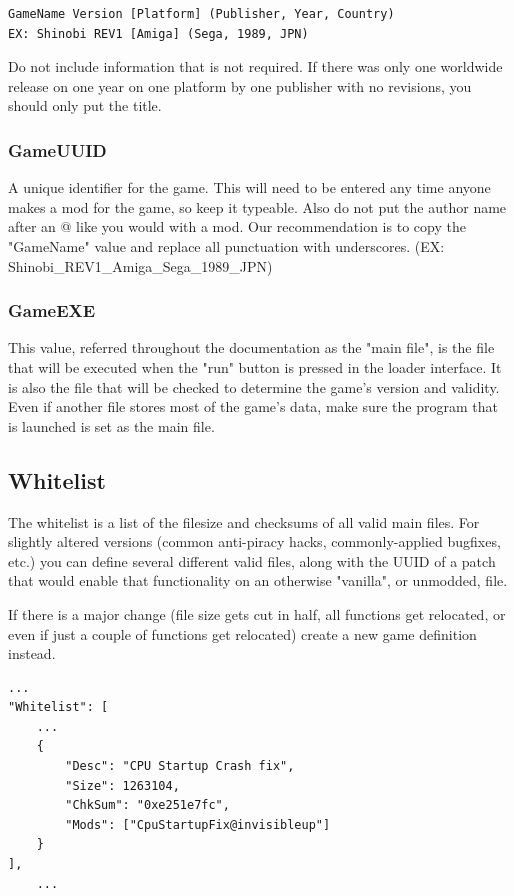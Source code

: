 \documentclass[12pt,a4paper,notitlepage]{article}
\begin{document}
\begin{lstlisting}[breaklines=true]
GameName Version [Platform] (Publisher, Year, Country)
EX: Shinobi REV1 [Amiga] (Sega, 1989, JPN)
\end{lstlisting}

Do not include information that is not required. If there was only one worldwide release on one year on one platform by one publisher with no revisions, you should only put the title.

\subsubsection{GameUUID}
A unique identifier for the game. This will need to be entered any time anyone makes a mod for the game, so keep it typeable. Also do not put the author name after an @ like you would with a mod. Our recommendation is to copy the "GameName" value and replace all punctuation with underscores. (EX: Shinobi\_REV1\_Amiga\_Sega\_1989\_JPN)

\subsubsection{GameEXE}
This value, referred throughout the documentation as the "main file", is the file that will be executed when the "run" button is pressed in the loader interface. It is also the file that will be checked to determine the game's version and validity. Even if another file stores most of the game's data, make sure the program that is launched is set as the main file.

\subsection{Whitelist}
The whitelist is a list of the filesize and checksums of all valid main files. For slightly altered versions (common anti-piracy hacks, commonly-applied bugfixes, etc.) you can define several different valid files, along with the UUID of a patch that would enable that functionality on an otherwise "vanilla", or unmodded, file.

If there is a major change (file size gets cut in half, all functions get relocated, or even if just a couple of functions get relocated) create a new game definition instead.

\begin{lstlisting}[breaklines=true]
...
"Whitelist": [
	...
	{
		"Desc": "CPU Startup Crash fix",
		"Size": 1263104,
		"ChkSum": "0xe251e7fc",
		"Mods": ["CpuStartupFix@invisibleup"]
	}
],
	...
\end{lstlisting}
\end{document}
